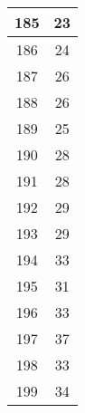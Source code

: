 \documentclass[letterpaper, 12pt]{article}
\begin{document}
\begin{longtable}{|c|c|}
\hline
185 & 23 \\
\hline
186 & 24 \\
\hline
187 & 26 \\
\hline
188 & 26 \\
\hline
189 & 25 \\
\hline
190 & 28 \\
\hline
191 & 28 \\
\hline
192 & 29 \\
\hline
193 & 29 \\
\hline
194 & 33 \\
\hline
195 & 31 \\
\hline
196 & 33 \\
\hline
197 & 37 \\
\hline
198 & 33 \\
\hline
199 & 34 \\
\hline
\end{longtable}
\end{document}
